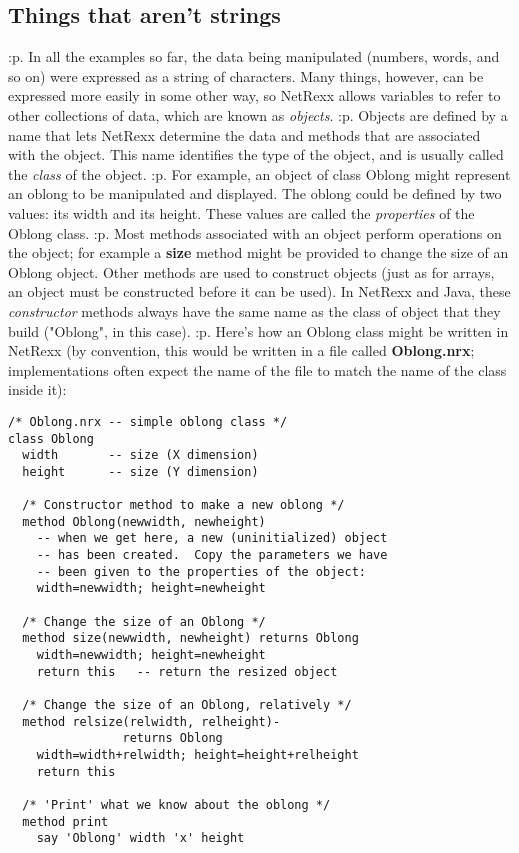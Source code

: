 \subsection{Things that aren't strings}\label{refoobjec}
:p.
In all the examples so far, the data being manipulated (numbers, words,
and so on) were expressed as a string of characters.  Many things,
however, can be expressed more easily in some other way, so NetRexx
allows variables to refer to other collections of data, which are known
as \emph{objects}.
:p.
Objects are defined by a name that lets NetRexx determine the data
and methods that are associated with the object.  This name identifies
the type of the object, and is usually called the \emph{class} of
the object.
:p.
For example, an object of class Oblong might represent an oblong to be
manipulated and displayed.  The oblong could be defined by two
values: its width and its height.  These values are called the
\emph{properties} of the Oblong class.
:p.
Most methods associated with an object perform operations on the object;
for example a \textbf{size} method might be provided to change the
size of an Oblong object.  Other methods are used to construct objects
(just as for arrays, an object must be constructed before it can
be used).  In NetRexx and Java, these \emph{constructor} methods
always have the same name as the class of object that they build
("Oblong", in this case).
:p.
Here's how an Oblong class might be written in NetRexx (by convention,
this would be written in a file called \textbf{Oblong.nrx};
implementations often expect the name of the file to match the name of
the class inside it):
\begin{verbatim}
/* Oblong.nrx -- simple oblong class */
class Oblong
  width       -- size (X dimension)
  height      -- size (Y dimension)

  /* Constructor method to make a new oblong */
  method Oblong(newwidth, newheight)
    -- when we get here, a new (uninitialized) object
    -- has been created.  Copy the parameters we have
    -- been given to the properties of the object:
    width=newwidth; height=newheight

  /* Change the size of an Oblong */
  method size(newwidth, newheight) returns Oblong
    width=newwidth; height=newheight
    return this   -- return the resized object

  /* Change the size of an Oblong, relatively */
  method relsize(relwidth, relheight)-
                returns Oblong
    width=width+relwidth; height=height+relheight
    return this

  /* 'Print' what we know about the oblong */
  method print
    say 'Oblong' width 'x' height
\end{verbatim}
